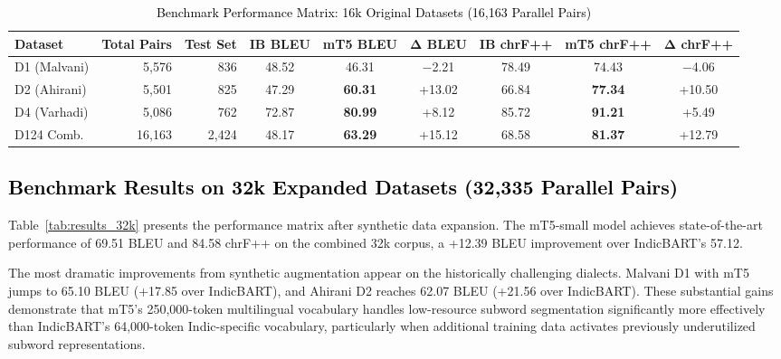 \begin{table}[t]
\color{black}
\centering
\caption{\textcolor{black}{Benchmark Performance Matrix: 16k Original Datasets (16,163 Parallel Pairs)}}
\label{tab:results_16k}
\begin{tabular}{lrrcccccc}
\hline
\textbf{Dataset} & \textbf{Total Pairs} & \textbf{Test Set} & \textbf{IB BLEU} & \textbf{mT5 BLEU} & $\boldsymbol{\Delta}$\textbf{ BLEU} & \textbf{IB chrF++} & \textbf{mT5 chrF++} & $\boldsymbol{\Delta}$\textbf{ chrF++} \\
\hline
D1 (Malvani) & 5,576 & 836 & 48.52 & 46.31 & $-$2.21 & 78.49 & 74.43 & $-$4.06 \\
D2 (Ahirani) & 5,501 & 825 & 47.29 & \textbf{60.31} & +13.02 & 66.84 & \textbf{77.34} & +10.50 \\
D4 (Varhadi) & 5,086 & 762 & 72.87 & \textbf{80.99} & +8.12 & 85.72 & \textbf{91.21} & +5.49 \\
\hline
D124 Comb. & 16,163 & 2,424 & 48.17 & \textbf{63.29} & +15.12 & 68.58 & \textbf{81.37} & +12.79 \\
\hline
\end{tabular}
\end{table}

\subsection{\textcolor{black}{Benchmark Results on 32k Expanded Datasets (32,335 Parallel Pairs)}}

Table~\ref{tab:results_32k} presents the performance matrix after synthetic data expansion. The mT5-small model achieves state-of-the-art performance of 69.51 BLEU and 84.58 chrF++ on the combined 32k corpus, a +12.39 BLEU improvement over IndicBART's 57.12.

The most dramatic improvements from synthetic augmentation appear on the historically challenging dialects. Malvani D1 with mT5 jumps to 65.10 BLEU (+17.85 over IndicBART), and Ahirani D2 reaches 62.07 BLEU (+21.56 over IndicBART). These substantial gains demonstrate that mT5's 250,000-token multilingual vocabulary handles low-resource subword segmentation significantly more effectively than IndicBART's 64,000-token Indic-specific vocabulary, particularly when additional training data activates previously underutilized subword representations.

